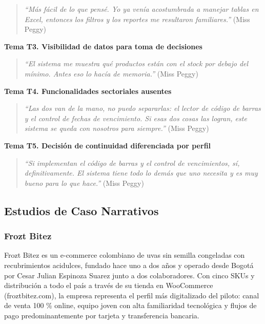 \begin{quote}
\emph{``Más fácil de lo que pensé. Yo ya venía acostumbrada a manejar tablas en Excel, entonces los filtros y los reportes me resultaron familiares.''} (Miss Peggy)
\end{quote}

\textbf{Tema T3. Visibilidad de datos para toma de decisiones}

\begin{quote}
\emph{``El sistema me muestra qué productos están con el stock por debajo del mínimo. Antes eso lo hacía de memoria.''} (Miss Peggy)
\end{quote}

\textbf{Tema T4. Funcionalidades sectoriales ausentes}

\begin{quote}
\emph{``Las dos van de la mano, no puedo separarlas: el lector de código de barras y el control de fechas de vencimiento. Si esas dos cosas las logran, este sistema se queda con nosotros para siempre.''} (Miss Peggy)
\end{quote}

\textbf{Tema T5. Decisión de continuidad diferenciada por perfil}

\begin{quote}
\emph{``Si implementan el código de barras y el control de vencimientos, sí, definitivamente. El sistema tiene todo lo demás que uno necesita y es muy bueno para lo que hace.''} (Miss Peggy)
\end{quote}

\subsection{Estudios de Caso Narrativos}\label{estudios-de-caso-narrativos}

\subsubsection{Frozt Bitez}\label{frozt-bitez}

Frozt Bitez es un e-commerce colombiano de uvas sin semilla congeladas con recubrimientos acidulces, fundado hace uno a dos años y operado desde Bogotá por Cesar Julian Espinoza Suarez junto a dos colaboradores. Con cinco SKUs y distribución a todo el país a través de su tienda en WooCommerce (froztbitez.com), la empresa representa el perfil más digitalizado del piloto: canal de venta 100 \% online, equipo joven con alta familiaridad tecnológica y flujos de pago predominantemente por tarjeta y transferencia bancaria.

